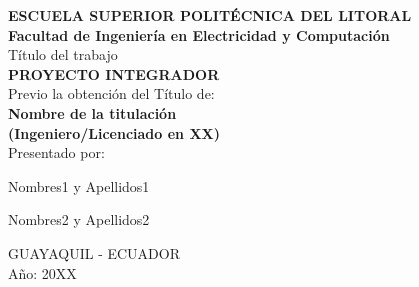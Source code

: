 \begin{titlepage}

\newcommand{\HRule}{\rule{\linewidth}{0.5mm}} %

\center %
 
{\fontsize{16}{20}\selectfont \textbf{ESCUELA SUPERIOR POLIT\'ECNICA DEL LITORAL}}
\\[3.0em]
{\fontsize{16}{20}\selectfont \textbf{Facultad de Ingenier\'ia en Electricidad y Computaci\'on}}\\[3.0em]


{\fontsize{14}{18}\selectfont T\'itulo del trabajo}\\[3.0em]
{\fontsize{16}{20}\selectfont \textbf{PROYECTO INTEGRADOR}}\\[1.5em] 
{\fontsize{16}{20}\selectfont Previo la obtenci\'on del T\'itulo de:}\\[1.5em] 
{\fontsize{16}{20}\selectfont \textbf{Nombre de la titulaci\'on \\ (Ingeniero/Licenciado en XX)}}\\[4.5em] 

{\fontsize{16}{20}\selectfont Presentado por:}\\[1.5em]
\author{Nombres1 y Apellidos1} {\fontsize{16}{20}\selectfont  Nombres1 y Apellidos1}\\[1.5em]
\author{Nombres2 y Apellidos2} {\fontsize{16}{20}\selectfont Nombres2 y Apellidos2}

\vspace{6.0em} %
{\fontsize{16}{20}\selectfont GUAYAQUIL - ECUADOR}\\[1.5em]
{\fontsize{16}{20}\selectfont A\~no: 20XX}

\vfill %
\newpage
$\ $
\thispagestyle{empty}
\end{titlepage}